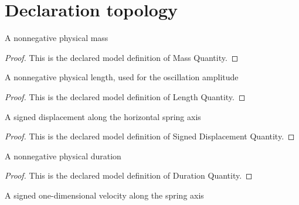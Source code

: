 \section{Declaration topology}
\begin{definition}
  \label{def:physics:phyx-mini-0717:phyxminiproblems-problemphyxmini0717-massquantity}
  A nonnegative physical mass
\end{definition}
\begin{proof}
  This is the declared model definition of Mass Quantity.
\end{proof}
\begin{definition}
  \label{def:physics:phyx-mini-0717:phyxminiproblems-problemphyxmini0717-lengthquantity}
  A nonnegative physical length, used for the oscillation amplitude
\end{definition}
\begin{proof}
  This is the declared model definition of Length Quantity.
\end{proof}
\begin{definition}
  \label{def:physics:phyx-mini-0717:phyxminiproblems-problemphyxmini0717-signeddisplacementquantity}
  A signed displacement along the horizontal spring axis
\end{definition}
\begin{proof}
  This is the declared model definition of Signed Displacement Quantity.
\end{proof}
\begin{definition}
  \label{def:physics:phyx-mini-0717:phyxminiproblems-problemphyxmini0717-durationquantity}
  A nonnegative physical duration
\end{definition}
\begin{proof}
  This is the declared model definition of Duration Quantity.
\end{proof}
\begin{definition}
  \label{def:physics:phyx-mini-0717:phyxminiproblems-problemphyxmini0717-signedvelocityquantity}
  A signed one-dimensional velocity along the spring axis
\end{definition}
